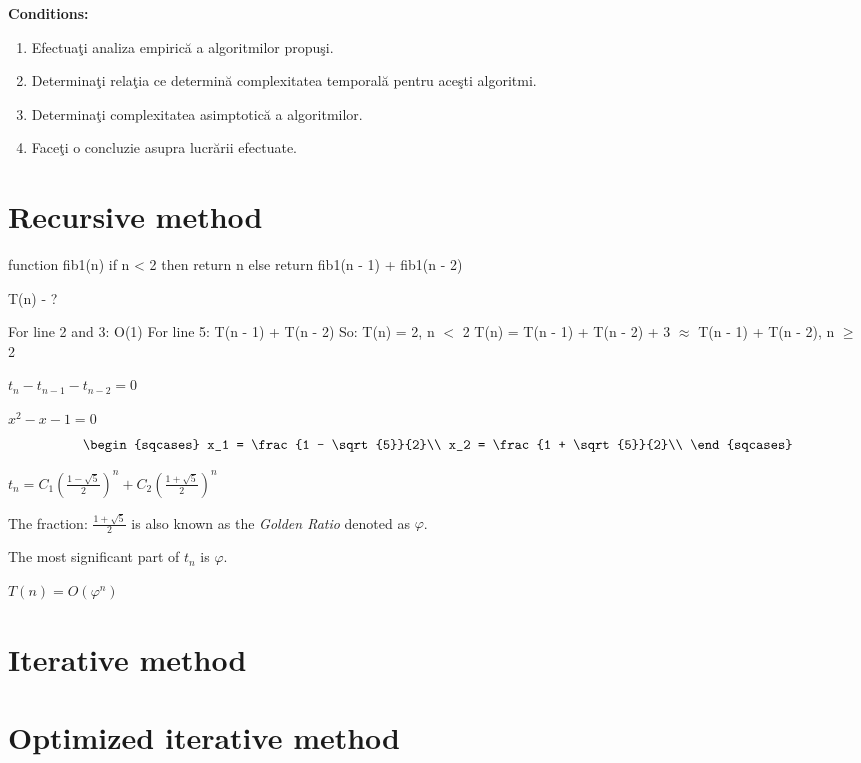 \documentclass{article}
\begin{document}
	\raggedright
	{\large \textbf{Conditions:}}
	\begin{enumerate}
		\item Efectuaţi analiza empirică a algoritmilor propuşi.
		\item Determinaţi relaţia ce determină complexitatea temporală pentru aceşti algoritmi.
		\item Determinaţi complexitatea asimptotică a algoritmilor.
		\item Faceţi o concluzie asupra lucrării efectuate.
	\end{enumerate}

	\newpage
	\section{Recursive method}

	\begin{algorithm}[caption={Recursive method}, label={Fibonaci}]
function fib1(n)
	if n < 2 then
		return n
	else
		return fib1(n - 1) + fib1(n - 2)
	\end{algorithm}
	\begin{center} T(n) - ? \end{center}
	\par For line 2 and 3: O(1)
	\newline For line 5: T(n - 1) + T(n - 2)
	\newline So:
	\newline T(n) = 2, n $<$ 2
	\newline T(n) = T(n - 1) + T(n - 2) + 3 $\approx$ T(n - 1) + T(n - 2), n $\geq$ 2
	\begin{center}
		$t_{n} - t_{n - 1} - t_{n - 2} = 0$
		\par $x^2 - x - 1 = 0$
		\[
			\begin{sqcases}
				x_1 = \frac{1 - \sqrt{5}}{2}\\
				x_2 = \frac{1 + \sqrt{5}}{2}\\
			\end{sqcases}
		\]

		$t_n = C_1 (\frac{1 - \sqrt{5}}{2})^n + C_2 (\frac{1 + \sqrt{5}}{2})^n$
	\end{center}
	The fraction: \textit{$\frac{1 + \sqrt{5}}{2}$} is also known as the \textit{Golden Ratio} denoted as $\varphi$.

	The most significant part of $t_n$ is $\varphi$.

	\begin{center}
		$T(n) = O(\varphi^n)$
	\end{center}

	\newpage
	\section{Iterative method}

	\newpage
	\section{Optimized iterative method}
\end{document}
